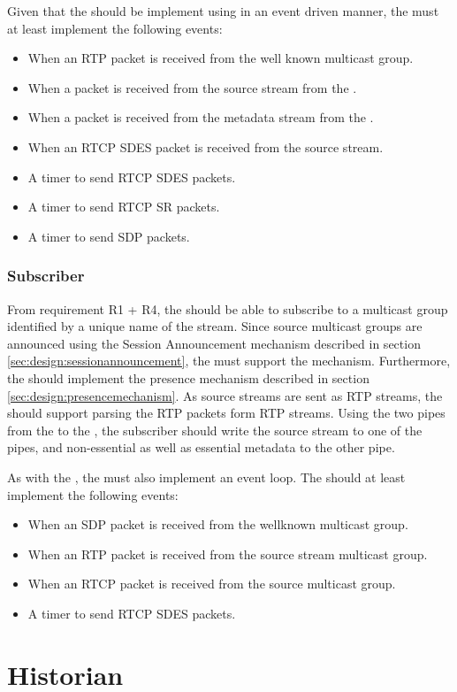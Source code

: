 Given that the \pub{} should be implement using in an event driven manner, the \pub{} must at least implement the following events:

\begin{itemize}
	\item When an RTP packet is received from the well known multicast group.
	\item When a packet is received from the source stream from the \pro{}.
	\item When a packet is received from the metadata stream from the \pro{}.
	\item When an RTCP SDES packet is received from the source stream.
	\item A timer to send RTCP SDES packets.
	\item A timer to send RTCP SR packets.
	\item A timer to send SDP packets.
\end{itemize}

\subsubsection{Subscriber} \label{sec:design:subscriber}
From requirement R1 + R4, the \sub{} should be able to subscribe to a multicast group identified by a unique name of the stream. Since source multicast groups are announced using the Session Announcement mechanism described in section \ref{sec:design:sessionannouncement}, the \sub{} must support the mechanism. Furthermore, the \sub{} should implement the presence mechanism described in section \ref{sec:design:presencemechanism}. As source streams are sent as RTP streams, the \sub{} should support parsing the RTP packets form RTP streams. Using the two pipes from the \sub{} to the \con{}, the subscriber should write the source stream to one of the pipes, and non-essential as well as essential metadata to the other pipe.

As with the \pub{}, the \sub{} must also implement an event loop. The \sub{} should at least implement the following events:

\begin{itemize}
	\item When an SDP packet is received from the wellknown multicast group.
	\item When an RTP packet is received from the source stream multicast group.
	\item When an RTCP packet is received from the source multicast group.
	\item A timer to send RTCP SDES packets.
\end{itemize}

\section{Historian}



